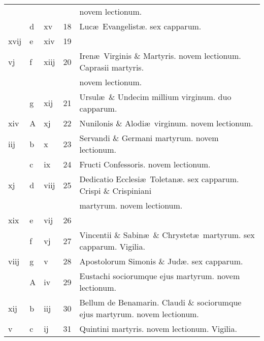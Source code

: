 \documentclass[letter,11pt]{book}
\begin{document}
\begin{center}
\begin{tabular}{l | l | l | r | l}
 &  &  &  & \quad \color{Red} novem lectionum. \\
\color{Red}  & d & \color{Red} xv & 18 & \color{Red} Luc\ae \ Evangelist\ae . \color{black} sex capparum. \\
\color{Red} xvij & e & \color{Red} xiv & 19 & \\
\color{Red} vj & f & \color{Red} xiij & 20 & Iren\ae \ Virginis \& Martyris. \color{Red} novem lectionum. \color{Red} Caprasii martyris. \\
 &  &  &  & \quad \color{Red} novem lectionum. \\
\color{Red}  & g & \color{Red} xij & 21 & Ursul\ae \ \& Undecim millium virginum. \color{Red} duo capparum. \\
\color{Red} xiv & \color{Red} A & \color{Red} xj & 22 & Nunilonis \& Alodi\ae \ virginum. \color{Red} novem lectionum. \\
\color{Red} iij & b & \color{Red} x & 23 & Servandi \& Germani martyrum. \color{Red} novem lectionum. \\
\color{Red}  & c & \color{Red} ix & 24 & Fructi Confessoris. \color{Red} novem lectionum. \\
\color{Red} xj & d & \color{Red} viij & 25 & Dedicatio Ecclesi\ae \ Toletan\ae . \color{Red} sex capparum. \color{black} Crispi \& Crispiniani \\
 &  &  &  & \quad martyrum. \color{Red} novem lectionum. \\
\color{Red} xix & e & \color{Red} vij & 26 & \\
\color{Red}  & f & \color{Red} vj & 27 & Vincentii \& Sabin\ae \ \& Chrystet\ae \ martyrum. \color{Red} sex capparum. \color{black} Vigilia. \\
\color{Red} viij & g & \color{Red} v & 28 & \color{Red} Apostolorum Simonis \& Jud\ae . \color{black} sex capparum. \\
\color{Red}  & \color{Red} A & \color{Red} iv & 29 & Eustachi sociorumque ejus martyrum. \color{Red} novem lectionum. \\
\color{Red} xij & b & \color{Red} iij & 30 & Bellum de Benamarin. \quad Claudi \& sociorumque ejus martyrum. \color{Red} novem lectionum. \\
\color{Red} v & c & \color{Red} ij & 31 & Quintini martyris. \color{Red} novem lectionum. \color{black} Vigilia. \\%
\end{tabular}
\end{center}
\end{document}
